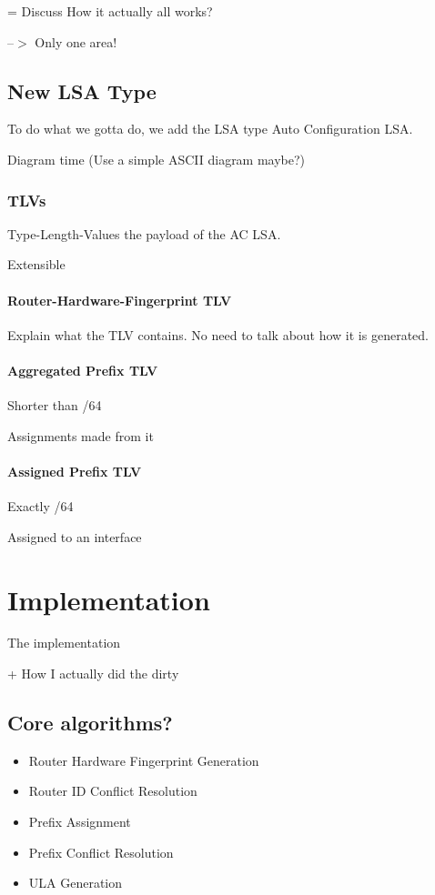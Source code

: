 \documentclass[12pt]{report}
\begin{document}
= Discuss How it actually all works?

--$>$ Only one area!

\section{New LSA Type}
To do what we gotta do, we add the LSA type Auto Configuration LSA. 

Diagram time (Use a simple ASCII diagram maybe?)

\subsection{TLVs}

Type-Length-Values the payload of the AC LSA. 

Extensible

\subsubsection{Router-Hardware-Fingerprint TLV}

Explain what the TLV contains. No need to talk about how it is generated.

\subsubsection{Aggregated Prefix TLV}

Shorter than /64 

Assignments made from it

\subsubsection{Assigned Prefix TLV}

Exactly /64 

Assigned to an interface

\chapter{Implementation}
The implementation

+ How I actually did the dirty

\section{Core algorithms?}

\begin{itemize}
  \item Router Hardware Fingerprint Generation
  \item Router ID Conflict Resolution
  \item Prefix Assignment
  \item Prefix Conflict Resolution
  \item ULA Generation
\end{itemize} 
\end{document}
